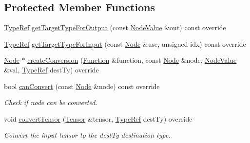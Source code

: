\subsection*{Protected Member Functions}
\begin{DoxyCompactItemize}
\item 
\hyperlink{structglow_1_1_type}{Type\+Ref} \hyperlink{classglow_1_1_type_a_to_type_b_function_converter_a98b9d067d1afe5811ed48d38e5029d63}{get\+Target\+Type\+For\+Output} (const \hyperlink{structglow_1_1_node_value}{Node\+Value} \&out) const override
\item 
\hyperlink{structglow_1_1_type}{Type\+Ref} \hyperlink{classglow_1_1_type_a_to_type_b_function_converter_a19c5372966cc435b4043c0b9f7f014b8}{get\+Target\+Type\+For\+Input} (const \hyperlink{classglow_1_1_node}{Node} \&use, unsigned idx) const override
\item 
\hyperlink{classglow_1_1_node}{Node} $\ast$ \hyperlink{classglow_1_1_type_a_to_type_b_function_converter_a875e9ce5a9b356ca34d8f8f52c9b7bf1}{create\+Conversion} (\hyperlink{classglow_1_1_function}{Function} \&function, const \hyperlink{classglow_1_1_node}{Node} \&node, \hyperlink{structglow_1_1_node_value}{Node\+Value} \&val, \hyperlink{structglow_1_1_type}{Type\+Ref} dest\+Ty) override
\item 
\mbox{\label{classglow_1_1_type_a_to_type_b_function_converter_acb83d144def5ae09b64f354430c2f643}} 
bool \hyperlink{classglow_1_1_type_a_to_type_b_function_converter_acb83d144def5ae09b64f354430c2f643}{can\+Convert} (const \hyperlink{classglow_1_1_node}{Node} \&node) const override
\begin{DoxyCompactList}\small\item\em Check if {\ttfamily node} can be converted. \end{DoxyCompactList}\item 
\mbox{\label{classglow_1_1_type_a_to_type_b_function_converter_ae2760cfe5e8635d1455e4eb91e1be9bc}} 
void \hyperlink{classglow_1_1_type_a_to_type_b_function_converter_ae2760cfe5e8635d1455e4eb91e1be9bc}{convert\+Tensor} (\hyperlink{classglow_1_1_tensor}{Tensor} \&tensor, \hyperlink{structglow_1_1_type}{Type\+Ref} dest\+Ty) override
\begin{DoxyCompactList}\small\item\em Convert the {\ttfamily input} tensor to the {\ttfamily dest\+Ty} destination type. \end{DoxyCompactList}\end{DoxyCompactItemize}
